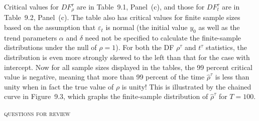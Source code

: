 Critical values for $DF_\rho^\tau$ are in Table~9.1, Panel~(c), and those for $DF_t^\tau$ are in Table~9.2, Panel~(c). The table also has critical values for finite sample sizes based on the
assumption that $\varepsilon_t$ is normal (the initial value $y_0$ as well as the trend parameters $\alpha$
and $\delta$ need not be specified to calculate the finite-sample distributions under the null of $\rho = 1$). For
both the DF $\rho^\tau$ and $t^\tau$ statistics, the distribution is even more strongly skewed to
the left than that for the case with intercept. Now for all sample sizes displayed in the
tables, the 99 percent critical value is negative, meaning that more than 99 percent
of the time $\hat{\rho}^\tau$ is less than unity when in fact the true value of $\rho$ is unity! This
is illustrated by the chained curve in Figure~9.3, which graphs the finite-sample
distribution of $\hat{\rho}^\tau$ for $T = 100$.

\bigskip
\noindent\textsc{questions for review} \hrulefill

